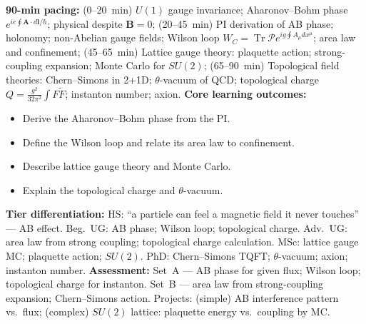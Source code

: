 \documentclass[11pt,a4paper]{article}
\begin{document}
\begin{tcolorbox}[modulebox, title={Module~II.2 --- Lecture L10: Gauge Fields and Topological Effects}]
\textbf{90-min pacing:} (0--20~min) $U(1)$ gauge invariance; Aharonov--Bohm phase $e^{ie\oint\mathbf{A}\cdot d\mathbf{l}/\hbar}$; physical despite $\mathbf{B}=0$; (20--45~min) PI derivation of AB phase; holonomy; non-Abelian gauge fields; Wilson loop $W_C=\operatorname{Tr}\mathcal{P}e^{ig\oint A_\mu dx^\mu}$; area law and confinement; (45--65~min) Lattice gauge theory: plaquette action; strong-coupling expansion; Monte Carlo for $SU(2)$; (65--90~min) Topological field theories: Chern--Simons in 2+1D; $\theta$-vacuum of QCD; topological charge $Q=\tfrac{g^2}{32\pi^2}\int F\tilde{F}$; instanton number; axion.
\medskip\textbf{Core learning outcomes:}
\begin{itemize}[leftmargin=1.4em,topsep=2pt,itemsep=1pt]
  \item Derive the Aharonov--Bohm phase from the PI.
  \item Define the Wilson loop and relate its area law to confinement.
  \item Describe lattice gauge theory and Monte Carlo.
  \item Explain the topological charge and $\theta$-vacuum.
\end{itemize}
\medskip\textbf{Tier differentiation:}
HS: ``a particle can feel a magnetic field it never touches'' --- AB effect.
Beg.\ UG: AB phase; Wilson loop; topological charge.
Adv.\ UG: area law from strong coupling; topological charge calculation.
MSc: lattice gauge MC; plaquette action; $SU(2)$.
PhD: Chern--Simons TQFT; $\theta$-vacuum; axion; instanton number.
\medskip\textbf{Assessment:}
Set~A --- AB phase for given flux; Wilson loop; topological charge for instanton.
Set~B --- area law from strong-coupling expansion; Chern--Simons action.
Projects: (simple) AB interference pattern vs.\ flux; (complex) $SU(2)$ lattice: plaquette energy vs.\ coupling by MC.
\end{tcolorbox}

\medskip
\end{document}
